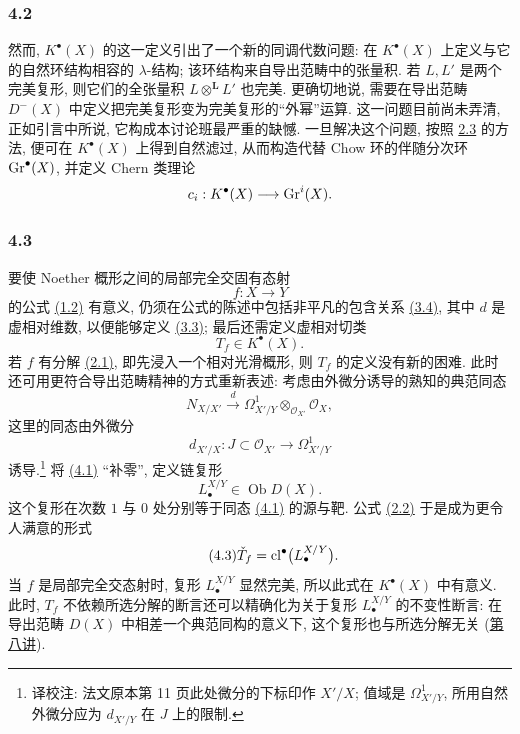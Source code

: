\subsubsection*{4.2}
然而, $K^\bullet(X)$ 的这一定义引出了一个新的同调代数问题: 在 $K^\bullet(X)$ 上定义与它的自然环结构相容的 $\lambda$-结构; 该环结构来自导出范畴中的张量积. 若 $L,L'$ 是两个完美复形, 则它们的全张量积 $L\otimes^{\mathbf L}L'$ 也完美. 更确切地说, 需要在导出范畴 $D^-(X)$ 中定义把完美复形变为完美复形的“外幂”运算. 这一问题目前尚未弄清, 正如引言中所说, 它构成本讨论班最严重的缺憾. 一旦解决这个问题, 按照 \hyperlink{sga6.e00.sec.2.3}{2.3} 的方法, 便可在 $K^\bullet(X)$ 上得到自然滤过, 从而构造代替 Chow 环的伴随分次环 $\operatorname{Gr}^\bullet(X)$, 并定义 Chern 类理论
\[
c_i:K^\bullet(X)\longrightarrow \operatorname{Gr}^i(X).
\]

\subsubsection*{4.3}
要使 Noether 概形之间的局部完全交固有态射
\[
f:X\longrightarrow Y
\]
的公式 \hyperlink{sga6.e00.eq.1-2}{(1.2)} 有意义, 仍须在公式的陈述中包括非平凡的包含关系 \hyperlink{sga6.e00.eq.3-4}{(3.4)}, 其中 $d$ 是虚相对维数, 以便能够定义 \hyperlink{sga6.e00.eq.3-3}{(3.3)}; 最后还需定义虚相对切类
\[
T_f\in K^\bullet(X).
\]
若 $f$ 有分解 \hyperlink{sga6.e00.eq.2-1}{(2.1)}, 即先浸入一个相对光滑概形, 则 $T_f$ 的定义没有新的困难. 此时还可用更符合导出范畴精神的方式重新表述: 考虑由外微分诱导的熟知的典范同态
\begin{equation}\tag{4.1}
N_{X/X'}\xrightarrow{d} \Omega^1_{X'/Y}\otimes_{\mathcal O_{X'}}\mathcal O_X,
\end{equation}
这里的同态由外微分
\[
d_{X'/X}:J\subset\mathcal O_{X'}\longrightarrow\Omega^1_{X'/Y}
\]
诱导.\footnote{译校注: 法文原本第 11 页此处微分的下标印作 $X'/X$; 值域是 $\Omega^1_{X'/Y}$, 所用自然外微分应为 $d_{X'/Y}$ 在 $J$ 上的限制.} 将 \hyperlink{sga6.e00.eq.4-1}{(4.1)} “补零”, 定义链复形
\begin{equation}\tag{4.2}
L^{X/Y}_\bullet\in\operatorname{Ob}D(X).
\end{equation}
这个复形在次数 $1$ 与 $0$ 处分别等于同态 \hyperlink{sga6.e00.eq.4-1}{(4.1)} 的源与靶. 公式 \hyperlink{sga6.e00.eq.2-2.outline}{(2.2)} 于是成为更令人满意的形式
\begin{equation}\tag{4.3}
\check T_f=\operatorname{cl}^\bullet\bigl(L^{X/Y}_\bullet\bigr).
\end{equation}
当 $f$ 是局部完全交态射时, 复形 $L^{X/Y}_\bullet$ 显然完美, 所以此式在 $K^\bullet(X)$ 中有意义. 此时, $T_f$ 不依赖所选分解的断言还可以精确化为关于复形 $L^{X/Y}_\bullet$ 的不变性断言: 在导出范畴 $D(X)$ 中相差一个典范同构的意义下, 这个复形也与所选分解无关 (\hyperlink{sga6.e08.expose}{第八讲}).

